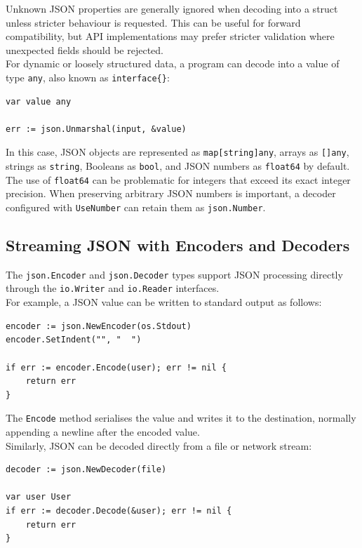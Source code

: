 Unknown JSON properties are generally ignored when decoding into a struct unless stricter behaviour is requested. This can be useful for forward compatibility, but API implementations may prefer stricter validation where unexpected fields should be rejected.\\

For dynamic or loosely structured data, a program can decode into a value of type \texttt{any}, also known as \texttt{interface\{\}}:

\begin{lstlisting}
var value any

err := json.Unmarshal(input, &value)
\end{lstlisting}

In this case, JSON objects are represented as \texttt{map[string]any}, arrays as \texttt{[]any}, strings as \texttt{string}, Booleans as \texttt{bool}, and JSON numbers as \texttt{float64} by default. The use of \texttt{float64} can be problematic for integers that exceed its exact integer precision. When preserving arbitrary JSON numbers is important, a decoder configured with \texttt{UseNumber} can retain them as \texttt{json.Number}.\\

\subsection{Streaming JSON with Encoders and Decoders}

The \texttt{json.Encoder} and \texttt{json.Decoder} types support JSON processing directly through the \texttt{io.Writer} and \texttt{io.Reader} interfaces.\\

For example, a JSON value can be written to standard output as follows:

\begin{lstlisting}
encoder := json.NewEncoder(os.Stdout)
encoder.SetIndent("", "  ")

if err := encoder.Encode(user); err != nil {
    return err
}
\end{lstlisting}

The \texttt{Encode} method serialises the value and writes it to the destination, normally appending a newline after the encoded value.\\

Similarly, JSON can be decoded directly from a file or network stream:

\begin{lstlisting}
decoder := json.NewDecoder(file)

var user User
if err := decoder.Decode(&user); err != nil {
    return err
}
\end{lstlisting}

